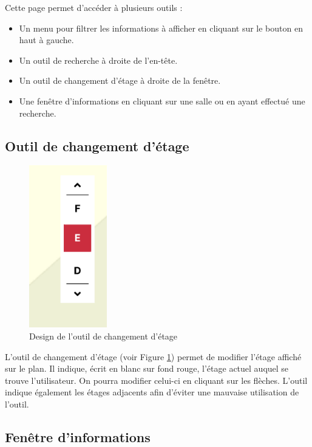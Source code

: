 \documentclass[
    iai, %
    il, %
]{heig-tb}
\begin{document}
Cette page permet d'accéder à plusieurs outils :

\begin{itemize}
    \item Un menu pour filtrer les informations à afficher en cliquant sur le bouton en haut à gauche.
    \item Un outil de recherche à droite de l'en-tête.
    \item Un outil de changement d'étage à droite de la fenêtre.
    \item Une fenêtre d'informations en cliquant sur une salle ou en ayant effectué une recherche.
\end{itemize}

\subsection{Outil de changement d'étage}

\begin{figure}[h]
    \centering
    \includegraphics[scale=0.8]{designChangementEtage.png}
    \caption{Design de l'outil de changement d'étage}
    \label{fig:floorChange}
\end{figure}

L'outil de changement d'étage (voir Figure \ref{fig:floorChange}) permet de modifier l'étage affiché sur le plan.
Il indique, écrit en blanc sur fond rouge, l'étage actuel auquel se trouve l'utilisateur.
On pourra modifier celui-ci en cliquant sur les flèches.
L'outil indique également les étages adjacents
afin d'éviter une mauvaise utilisation de l'outil.

\subsection{Fenêtre d'informations}
\end{document}
